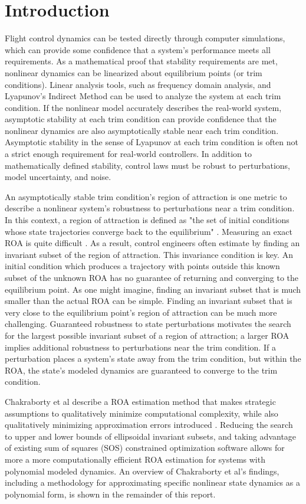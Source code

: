 \documentclass[%
 reprint,
 amsmath,amssymb,
 aps,
]{revtex4-2}
\begin{document}
\section{Introduction}
Flight control dynamics can be tested directly through computer simulations, which can provide some confidence that a system's performance meets all requirements. As a mathematical proof that stability requirements are met, nonlinear dynamics can be linearized about equilibrium points (or trim conditions). Linear analysis tools, such as frequency domain analysis, and Lyapunov's Indirect Method can be used to analyze the system at each trim condition. If the nonlinear model accurately describes the real-world system, asymptotic stability at each trim condition can provide confidence that the nonlinear dynamics are also asymptotically stable near each trim condition. Asymptotic stability in the sense of Lyapunov at each trim condition is often not a strict enough requirement for real-world controllers. In addition to mathematically defined stability, control laws must be robust to perturbations, model uncertainty, and noise. 

An asymptotically stable trim condition's region of attraction is one metric to describe a nonlinear system's robustness to perturbations near a trim condition. In this context, a region of attraction is defined as "the set of initial conditions whose state trajectories converge back to the equilibrium" \cite{leaf}\cite{khalil}. Measuring an exact ROA is quite difficult \cite{primary}. As a result, control engineers often estimate by finding an invariant subset of the region of attraction. This invariance condition is key. An initial condition which produces a trajectory with points outside this known subset of the unknown ROA has no guarantee of returning and converging to the equilibrium point. As one might imagine, finding an invariant subset that is much smaller than the actual ROA can be simple. Finding an invariant subset that is very close to the equilibrium point's region of attraction can be much more challenging. Guaranteed robustness to state perturbations motivates the search for the largest possible invariant subset of a region of attraction; a larger ROA implies additional robustness to perturbations near the trim condition. If a perturbation places a system's state away from the trim condition, but within the ROA, the state's modeled dynamics are guaranteed to converge to the trim condition.

Chakraborty et al describe a ROA estimation method that makes strategic assumptions to qualitatively minimize computational complexity, while also qualitatively minimizing approximation errors introduced \cite{primary}. Reducing the search to upper and lower bounds of ellipsoidal invariant subsets, and taking advantage of existing sum of squares (SOS) constrained optimization software \cite{sosopt}\cite{sostools} allows for more a more computationally efficient ROA estimation for systems with polynomial modeled dynamics. An overview of Chakraborty et al's findings, including a methodology for approximating specific nonlinear state dynamics as a polynomial form, is shown in the remainder of this report.
\end{document}
